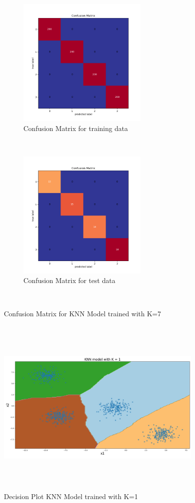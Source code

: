\begin{figure}[!ht]
    \centering
    \begin{subfigure}[t]{0.5\textwidth}
        \centering
        \includegraphics[height=2.5in]{Dataset_1a/K_1_cmatrix_train_data.png}
        \caption{Confusion Matrix for training data}
    \end{subfigure}%
    ~ 
    \begin{subfigure}[t]{0.5\textwidth}
        \centering
        \includegraphics[height=2.5in]{Dataset_1a/K_1_cmatrix_test_data.png}
        \caption{Confusion Matrix for test data}
    \end{subfigure}%
    ~
    \caption{Confusion Matrix for KNN Model trained with K=7}
    \label{fig:1}
\end{figure}


\begin{figure}[!ht]
    \centering
    \includegraphics[height=3.5in,width=4in]{Dataset_1a/K_1_decision_plot.png}
    \caption{Decision Plot KNN Model trained with K=1}
    \label{fig:2}
\end{figure}

